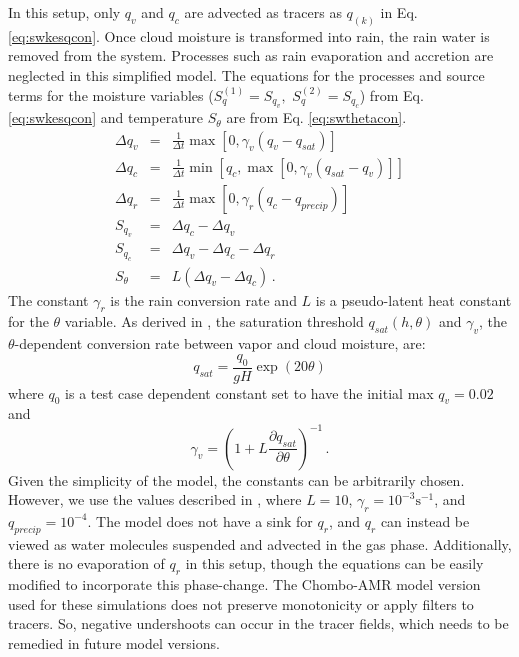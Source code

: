 \documentclass{ametsoc}
\begin{document}
In this setup, only $q_v$ and $q_c$ are advected as 
tracers as $q_{(k)}$ in Eq. \ref{eq:swkesqcon}. Once cloud moisture is transformed 
into rain, the rain water is removed from the system. Processes such as rain evaporation and 
accretion are neglected in this simplified model. The equations for 
the processes and source terms for the moisture variables 
($S_q^{(1)}=S_{q_v}, \,\, S_q^{(2)}=S_{q_c}$) from Eq. \ref{eq:swkesqcon} 
and temperature $S_\theta$ are from Eq. \ref{eq:swthetacon}.
   \begin{eqnarray}
     \Delta q_v & = & \frac{1}{\Delta t}\max \left[ 0, \gamma_v\left(q_v - q_{sat}\right)\right]\\
     \Delta q_c & = & \frac{1}{\Delta t}\min\left[ q_c, \max \left[0, \gamma_v\left(q_{sat} - q_v \right)\right]\right] \\
     \Delta q_r & = & \frac{1}{\Delta t}\max \left[ 0, \gamma_r\left(q_c - q_{precip}\right)\right]\\
     S_{q_v} & = & \Delta q_c - \Delta q_v \\
     S_{q_c} & = & \Delta q_v - \Delta q_c - \Delta q_r \\
     S_{\theta} & = & L\left(\Delta q_v - \Delta q_c\right)\,.
   \end{eqnarray}
The constant $\gamma_r$ is the rain conversion rate and $L$ is a pseudo-latent heat 
constant for the $\theta$ variable. As derived in \cite{zerroukat2015moist}, the 
 saturation threshold $q_{sat}(h, \theta)$ and $\gamma_v$, the $\theta$-dependent 
conversion rate between vapor and cloud moisture, are:
   \begin{equation}
     \label{eq:qsat} q_{sat} = \frac{q_0}{gH}\exp{(20\theta)}
   \end{equation}
   where $q_0$ is a test case dependent constant set to have the initial max $q_v=0.02$ and
   \begin{equation}
     \label{eq:gammav} \gamma_v = \left(1 + L \frac{\partial q_{sat}}{\partial \theta}\right)^{-1} \, .
   \end{equation}
Given the simplicity of the model, the constants can be arbitrarily chosen. 
However, we use the values described in \cite{zerroukat2015moist}, 
where $L=10$, $\gamma_r = 10^{-3} \mathrm{ s}^{-1}$, and $q_{precip} = 10^{-4}$. 
The model does not have a sink for $q_r$, and $q_r$ can instead be viewed 
as water molecules suspended and advected in the gas phase. Additionally, there
is no evaporation of $q_r$ in this setup, though the equations can be 
easily modified to incorporate this phase-change. 
The Chombo-AMR model version used for these simulations does
not preserve monotonicity or apply filters to tracers. So, 
negative undershoots can occur in the tracer fields, which needs to
be remedied in future model versions.
  
\end{document}
